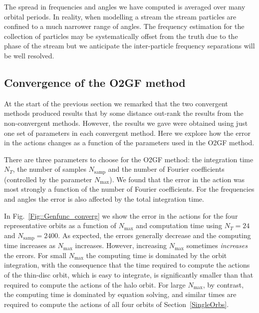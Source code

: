 \documentclass[useAMS,usenatbib,fleqn,a4paper]{mn2e}
\begin{document}
The spread in frequencies and angles we have computed is averaged over many orbital periods. In reality, when modelling a stream the stream particles are confined to a much narrower range of angles. The frequency estimation for the collection of particles may be systematically offset from the truth due to the phase of the stream but we anticipate the inter-particle frequency separations will be well resolved.

\subsection{Convergence of the O2GF method}

At the start of the previous section we remarked that the two convergent
methods produced results that by some distance out-rank the results from the
non-convergent methods. However, the results we gave were obtained using just
one set of parameters in each convergent method.  Here we explore how the
error in the actions changes as a function of the parameters used in the O2GF
method.

There are three parameters to choose for the O2GF method: the
integration time $N_T$, the number of samples $N_\mathrm{samp}$ and the
number of Fourier coefficients (controlled by the parameter
$N_\mathrm{max}$). We found that the error in the action
was most strongly a function of the number of Fourier coefficients. For the
frequencies and angles the error is also affected by the total integration
time.

In Fig.~\ref{Fig::Genfunc_converg} we show the error in the actions for the
four representative orbits as a function of $N_\mathrm{max}$ and computation
time using $N_T=24$ and $N_\mathrm{samp}=2400$. As expected, the errors
generally decrease and the computing time increases as $N_\mathrm{max}$
increases. However, increasing $N_\mathrm{max}$  sometimes {\it increases}
the errors.  For small $N_\mathrm{max}$ the computing time is dominated by
the orbit integration, with the consequence that the time required to compute the
actions of the thin-disc orbit, which is
easy to integrate, is significantly smaller than that required to compute the
actions of the halo orbit. For large $N_\mathrm{max}$, by contrast, the
computing time is dominated by equation solving, and similar times are
required to compute the actions of all four orbits of
Section~\ref{SingleOrbs}.

\end{document}
